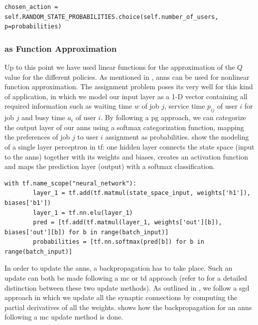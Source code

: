 \documentclass{seal_thesis}
\begin{document}
\begin{lstlisting}[caption=Probabilistic user choice,label=lst:prob_user_choice,style=CustomPython]
	chosen_action = self.RANDOM_STATE_PROBABILITIES.choice(self.number_of_users, p=probabilities)
\end{lstlisting}

\subsubsection{ as Function Approximation}

Up to this point we have used linear functions for the approximation of the $Q$ value for the different policies. As mentioned in , \glspl{ann} can be used for nonlinear function approximation. The assignment problem poses its very well for this kind of application, in which we model our input layer as a 1-D vector containing all required information such as waiting time $w$ of job $j$, service time $p_{ij}$ of user $i$ for job $j$ and busy time $a_i$ of user $i$. By following a \gls{pg} approach, we can categorize the output layer of our \glspl{ann} using a softmax categorization function, mapping the preferences of job $j$ to user $i$ assignment as probabilities.  show the modeling of a single layer perceptron in \gls{tf}: one hidden layer connects the state space (\ie input to the \glspl{ann}) together with its weights and biases, creates an activation function and maps the prediction layer (\ie output) with a softmax classification.

\begin{lstlisting}[caption=Modeling of a single perceptron in \gls{tf},label=lst:ann_1h,style=CustomPython]
	with tf.name_scope("neural_network"):
    	layer_1 = tf.add(tf.matmul(state_space_input, weights['h1']), biases['b1'])
    	layer_1 = tf.nn.elu(layer_1)
    	pred = [tf.add(tf.matmul(layer_1, weights['out'][b]), biases['out'][b]) for b in range(batch_input)]
    	probabilities = [tf.nn.softmax(pred[b]) for b in range(batch_input)]
\end{lstlisting}

In order to update the \glspl{ann}, a backpropagation has to take place. Such an update can both be made following a \gls{mc} or \gls{td} approach (refer to  for a detailed distinction between these two update methods). As outlined in , we follow a \gls{sgd} approach in which we update all the synaptic connections by computing the partial derivatives of all the weights.  shows how the backpropagation for an \glspl{ann} following a \gls{mc} update method is done.
\end{document}
